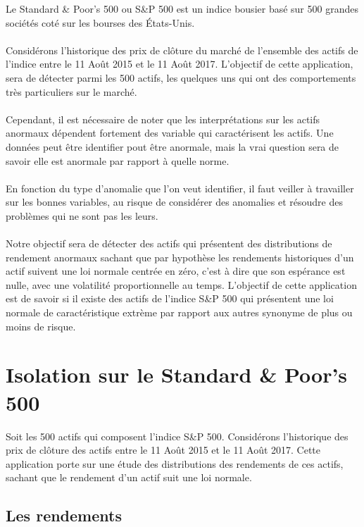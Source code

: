 Le Standard \& Poor's 500 ou S\&P 500 est un indice bousier basé sur 500 grandes sociétés coté sur les bourses des États-Unis.
\\
\\
Considérons l'historique des prix de clôture du marché de l'ensemble des actifs de l'indice entre le 11 Août 2015 et le  11 Août 2017. L'objectif de cette application, sera de détecter parmi les 500 actifs, les quelques uns qui ont des comportements très particuliers sur le marché.
\\
\\
Cependant, il est nécessaire de noter que les interprétations sur les actifs anormaux dépendent fortement des variable qui caractérisent les actifs. Une données peut être identifier pout être anormale, mais la vrai question sera de savoir elle est anormale par rapport à quelle norme.
\\
\\
En fonction du type d'anomalie que l'on veut identifier, il faut veiller à travailler sur les bonnes variables, au risque de considérer des anomalies et résoudre des problèmes qui ne sont pas les leurs.
\\
\\
Notre objectif sera de détecter des actifs qui présentent des distributions de rendement anormaux sachant que par hypothèse les rendements historiques d'un actif suivent une loi normale centrée en zéro, c'est à dire que son espérance est nulle, avec une volatilité proportionnelle au temps. L'objectif de cette application est de savoir si il existe des actifs de l'indice S\&P 500 qui présentent une loi normale de caractéristique extrème par rapport aux autres synonyme de plus ou moins de risque.

\section{Isolation sur le Standard \& Poor's 500}

Soit les 500 actifs qui composent l'indice S\&P 500. 
Considérons l'historique des prix de clôture des actifs entre le 11 Août 2015 et le  11 Août 2017.
Cette application porte sur une étude des distributions des rendements de ces actifs, sachant que le rendement d'un actif suit une loi normale. 

\subsection{Les rendements}

